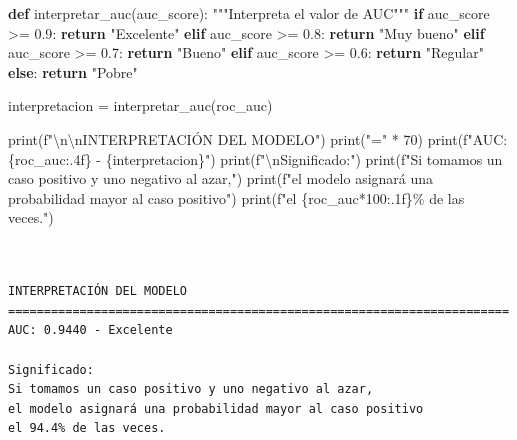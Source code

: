 \documentclass[
  doc,
  floatsintext,
  longtable,
  a4paper,
  nolmodern,
  notxfonts,
  notimes,
  12pt,
  colorlinks=true,linkcolor=blue,citecolor=blue,urlcolor=blue]{apa7}
\newenvironment{Shaded}{\begin{snugshade}}{\end{snugshade}}
\newcommand{\BuiltInTok}[1]{\textcolor[rgb]{0.00,0.23,0.31}{#1}}
\newcommand{\CharTok}[1]{\textcolor[rgb]{0.13,0.47,0.30}{#1}}
\newcommand{\CommentTok}[1]{\textcolor[rgb]{0.37,0.37,0.37}{#1}}
\newcommand{\ControlFlowTok}[1]{\textcolor[rgb]{0.00,0.23,0.31}{\textbf{#1}}}
\newcommand{\DecValTok}[1]{\textcolor[rgb]{0.68,0.00,0.00}{#1}}
\newcommand{\FloatTok}[1]{\textcolor[rgb]{0.68,0.00,0.00}{#1}}
\newcommand{\KeywordTok}[1]{\textcolor[rgb]{0.00,0.23,0.31}{\textbf{#1}}}
\newcommand{\NormalTok}[1]{\textcolor[rgb]{0.00,0.23,0.31}{#1}}
\newcommand{\OperatorTok}[1]{\textcolor[rgb]{0.37,0.37,0.37}{#1}}
\newcommand{\SpecialCharTok}[1]{\textcolor[rgb]{0.37,0.37,0.37}{#1}}
\newcommand{\SpecialStringTok}[1]{\textcolor[rgb]{0.13,0.47,0.30}{#1}}
\newcommand{\StringTok}[1]{\textcolor[rgb]{0.13,0.47,0.30}{#1}}
\begin{document}
\begin{Shaded}
\begin{Highlighting}[]
\KeywordTok{def}\NormalTok{ interpretar\_auc(auc\_score):}
    \CommentTok{"""Interpreta el valor de AUC"""}
    \ControlFlowTok{if}\NormalTok{ auc\_score }\OperatorTok{\textgreater{}=} \FloatTok{0.9}\NormalTok{:}
        \ControlFlowTok{return} \StringTok{"Excelente"}
    \ControlFlowTok{elif}\NormalTok{ auc\_score }\OperatorTok{\textgreater{}=} \FloatTok{0.8}\NormalTok{:}
        \ControlFlowTok{return} \StringTok{"Muy bueno"}
    \ControlFlowTok{elif}\NormalTok{ auc\_score }\OperatorTok{\textgreater{}=} \FloatTok{0.7}\NormalTok{:}
        \ControlFlowTok{return} \StringTok{"Bueno"}
    \ControlFlowTok{elif}\NormalTok{ auc\_score }\OperatorTok{\textgreater{}=} \FloatTok{0.6}\NormalTok{:}
        \ControlFlowTok{return} \StringTok{"Regular"}
    \ControlFlowTok{else}\NormalTok{:}
        \ControlFlowTok{return} \StringTok{"Pobre"}

\NormalTok{interpretacion }\OperatorTok{=}\NormalTok{ interpretar\_auc(roc\_auc)}

\BuiltInTok{print}\NormalTok{(}\SpecialStringTok{f"}\CharTok{\textbackslash{}n\textbackslash{}n}\SpecialStringTok{INTERPRETACIÓN DEL MODELO"}\NormalTok{)}
\BuiltInTok{print}\NormalTok{(}\StringTok{"="} \OperatorTok{*} \DecValTok{70}\NormalTok{)}
\BuiltInTok{print}\NormalTok{(}\SpecialStringTok{f"AUC: }\SpecialCharTok{\{}\NormalTok{roc\_auc}\SpecialCharTok{:.4f\}}\SpecialStringTok{ {-} }\SpecialCharTok{\{}\NormalTok{interpretacion}\SpecialCharTok{\}}\SpecialStringTok{"}\NormalTok{)}
\BuiltInTok{print}\NormalTok{(}\SpecialStringTok{f"}\CharTok{\textbackslash{}n}\SpecialStringTok{Significado:"}\NormalTok{)}
\BuiltInTok{print}\NormalTok{(}\SpecialStringTok{f"Si tomamos un caso positivo y uno negativo al azar,"}\NormalTok{)}
\BuiltInTok{print}\NormalTok{(}\SpecialStringTok{f"el modelo asignará una probabilidad mayor al caso positivo"}\NormalTok{)}
\BuiltInTok{print}\NormalTok{(}\SpecialStringTok{f"el }\SpecialCharTok{\{}\NormalTok{roc\_auc}\OperatorTok{*}\DecValTok{100}\SpecialCharTok{:.1f\}}\SpecialStringTok{\% de las veces."}\NormalTok{)}
\end{Highlighting}
\end{Shaded}

\begin{verbatim}


INTERPRETACIÓN DEL MODELO
======================================================================
AUC: 0.9440 - Excelente

Significado:
Si tomamos un caso positivo y uno negativo al azar,
el modelo asignará una probabilidad mayor al caso positivo
el 94.4% de las veces.
\end{verbatim}
\end{document}
